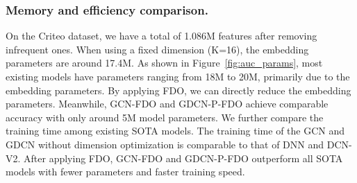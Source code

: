 \documentclass[sigconf]{acmart}
\begin{document}
\begin{table}[t]
\setlength{\abovecaptionskip}{0.2cm}
\setlength{\belowcaptionskip}{-0.2cm}
\centering
\caption{The effectiveness of GCN with FDO approach. All results are statistically significant with p<0.001 compared to the full (16) model with fixed dimension.  M is million.} 
\label{tab:variance}
\end{table}

\subsubsection{Memory and efficiency comparison.} On the Criteo dataset, we have a total of 1.086M features after removing infrequent ones. When using a fixed dimension (K=16), the embedding parameters are around 17.4M. As shown in Figure~\ref{fig:auc_params}, most existing models have parameters ranging from 18M to 20M, primarily due to the embedding parameters. By applying FDO, we can directly reduce the embedding parameters. Meanwhile, GCN-FDO and GDCN-P-FDO achieve comparable accuracy with only around 5M model parameters. We further compare the training time among existing SOTA models. The training time of the GCN and GDCN without dimension optimization is comparable to that of DNN and DCN-V2. After applying FDO, GCN-FDO and GDCN-P-FDO outperform all SOTA models with fewer parameters and faster training speed. 
\end{document}
